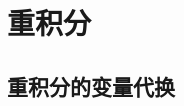 \chapter{重积分}

\section{重积分的变量代换}

\newtheorem{about_re_integration_var_subsitution_2}[theorem_root]{\theorem}